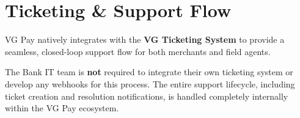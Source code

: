 \documentclass[11pt,a4paper]{article}
\begin{document}
\newpage
\section{Ticketing \& Support Flow}

VG Pay natively integrates with the \textbf{VG Ticketing System} to provide a seamless, closed-loop support flow for both merchants and field agents.

\begin{tcolorbox}[colback=green!5!white,colframe=green!75!black,title=No Bank Integration Required]
The Bank IT team is \textbf{not} required to integrate their own ticketing system or develop any webhooks for this process. The entire support lifecycle, including ticket creation and resolution notifications, is handled completely internally within the VG Pay ecosystem.
\end{tcolorbox}
\end{document}
